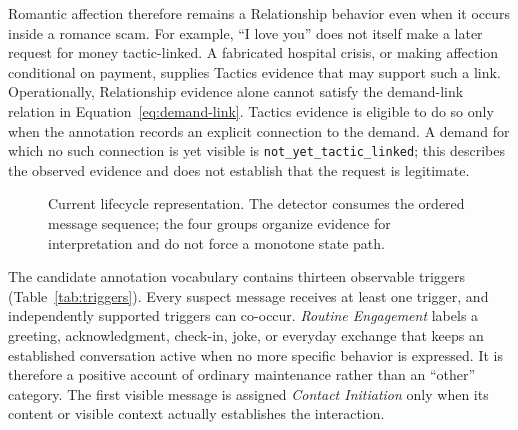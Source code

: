 \documentclass[letterpaper,11pt]{article}
\begin{document}
Romantic affection therefore remains a Relationship behavior even when it occurs
inside a romance scam. For example, ``I love you'' does not itself make a later
request for money tactic-linked. A fabricated hospital crisis, or making affection
conditional on payment, supplies Tactics evidence that may support such a link.
Operationally, Relationship evidence alone cannot satisfy the demand-link relation
in Equation~\ref{eq:demand-link}. Tactics evidence is eligible to do so only when
the annotation records an explicit connection to the demand. A demand for which no
such connection is yet visible is \texttt{not\_yet\_tactic\_linked}; this describes
the observed evidence and does not establish that the request is legitimate.

\begin{figure}[tb]
\centering\resizebox{\linewidth}{!}{}
\caption{Current lifecycle representation. The detector consumes the ordered
message sequence; the four groups organize evidence for interpretation and do
not force a monotone state path.}
\label{fig:lifecycle}
\end{figure}

The candidate annotation vocabulary contains thirteen observable triggers
(Table~\ref{tab:triggers}). Every suspect message receives at least one trigger,
and independently supported triggers can co-occur. \emph{Routine Engagement}
labels a greeting, acknowledgment, check-in, joke, or everyday exchange that
keeps an established conversation active when no more specific behavior is
expressed. It is therefore a positive account of ordinary maintenance rather
than an ``other'' category. The first visible message is assigned
\emph{Contact Initiation} only when its content or visible context actually
establishes the interaction.
\end{document}
